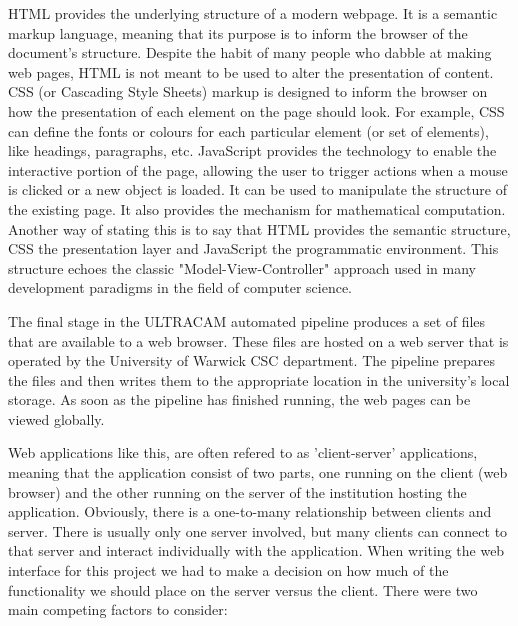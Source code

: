 HTML provides the underlying structure of a modern webpage. It is a semantic markup language, meaning that its purpose is to inform the browser of the document's structure. Despite the habit of many people who dabble at making web pages, HTML is not meant to be used to alter the presentation of content. CSS (or Cascading Style Sheets) markup is designed to inform the browser on how the presentation of each element on the page should look. For example, CSS can define the fonts or colours for each particular element (or set of elements), like headings, paragraphs, etc. JavaScript provides the technology to enable the interactive portion of the page, allowing the user to trigger actions when a mouse is clicked or a new object is loaded. It can be used to manipulate the structure of the existing page. It also provides the mechanism for mathematical computation. Another way of stating this is to say that HTML provides the semantic structure, CSS the presentation layer and JavaScript the programmatic environment. This structure echoes the classic "Model-View-Controller" approach used in many development paradigms in the field of computer science.

The final stage in the ULTRACAM automated pipeline produces a set of files that are available to a web browser. These files are hosted on a web server that is operated by the University of Warwick CSC department. The pipeline prepares the files and then writes them to the appropriate location in the university's local storage. As soon as the pipeline has finished running, the web pages can be viewed globally. 

\label{sect:clientserver}
Web applications like this, are often refered to as 'client-server' applications, meaning that the application consist of two parts, one running on the client (web browser) and the other running on the server of the institution hosting the application. Obviously, there is a one-to-many relationship between clients and server. There is usually only one server involved, but many clients can connect to that server and interact individually with the application. When writing the web interface for this project we had to make a decision on how much of the functionality we should place on the server versus the client. There were two main competing factors to consider:

